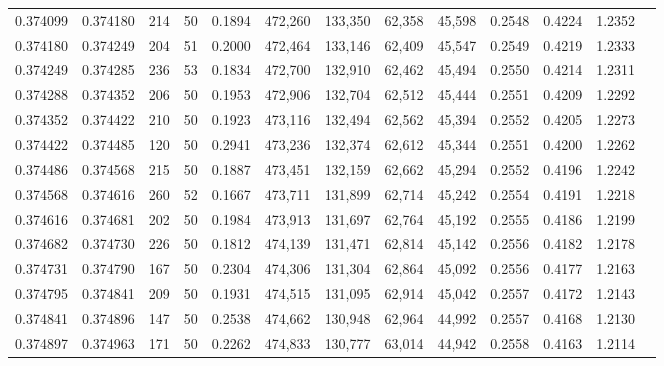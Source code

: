 \begin{tabular}{rrrrrrrrrrrrr}
0.374099 & 0.374180 &   214 &  50 &                                     0.1894 & 472,260 & 133,350 &  62,358 &  45,598 & 0.2548 & 0.4224 & 1.2352 \\
0.374180 & 0.374249 &   204 &  51 &                                     0.2000 & 472,464 & 133,146 &  62,409 &  45,547 & 0.2549 & 0.4219 & 1.2333 \\
0.374249 & 0.374285 &   236 &  53 &                                     0.1834 & 472,700 & 132,910 &  62,462 &  45,494 & 0.2550 & 0.4214 & 1.2311 \\
0.374288 & 0.374352 &   206 &  50 &                                     0.1953 & 472,906 & 132,704 &  62,512 &  45,444 & 0.2551 & 0.4209 & 1.2292 \\
0.374352 & 0.374422 &   210 &  50 &                                     0.1923 & 473,116 & 132,494 &  62,562 &  45,394 & 0.2552 & 0.4205 & 1.2273 \\
0.374422 & 0.374485 &   120 &  50 &                                     0.2941 & 473,236 & 132,374 &  62,612 &  45,344 & 0.2551 & 0.4200 & 1.2262 \\
0.374486 & 0.374568 &   215 &  50 &                                     0.1887 & 473,451 & 132,159 &  62,662 &  45,294 & 0.2552 & 0.4196 & 1.2242 \\
0.374568 & 0.374616 &   260 &  52 &                                     0.1667 & 473,711 & 131,899 &  62,714 &  45,242 & 0.2554 & 0.4191 & 1.2218 \\
0.374616 & 0.374681 &   202 &  50 &                                     0.1984 & 473,913 & 131,697 &  62,764 &  45,192 & 0.2555 & 0.4186 & 1.2199 \\
0.374682 & 0.374730 &   226 &  50 &                                     0.1812 & 474,139 & 131,471 &  62,814 &  45,142 & 0.2556 & 0.4182 & 1.2178 \\
0.374731 & 0.374790 &   167 &  50 &                                     0.2304 & 474,306 & 131,304 &  62,864 &  45,092 & 0.2556 & 0.4177 & 1.2163 \\
0.374795 & 0.374841 &   209 &  50 &                                     0.1931 & 474,515 & 131,095 &  62,914 &  45,042 & 0.2557 & 0.4172 & 1.2143 \\
0.374841 & 0.374896 &   147 &  50 &                                     0.2538 & 474,662 & 130,948 &  62,964 &  44,992 & 0.2557 & 0.4168 & 1.2130 \\
0.374897 & 0.374963 &   171 &  50 &                                     0.2262 & 474,833 & 130,777 &  63,014 &  44,942 & 0.2558 & 0.4163 & 1.2114 \\

\end{tabular}
